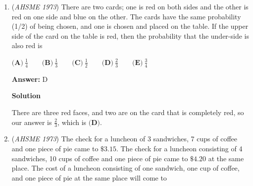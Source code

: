 \begin{enumerate}


 
 \textbf{Answer: }A



\textbf{Solution}

We can do casework upon the value of $x$. First, consider the case where both absolute values are positive, which is when $x \geq 1$. In this case, the equation becomes $2x + 1 < 5$. This turns into $x < 2$. Combining this with our original assumption, we get the solutions $1 \leq x < 2$. 

 Next, consider the case when both absolute values are negative, which is when $x < -2$. This yields $-1 - 2x < 5$, or $x > -3$. Combining this with our original assumption, we get $-3 < x < -2$

 The next case is when the first absolute value is positive and the second is negative. This occurs when $x \geq 1$ and $x < -2$. Obviously, this has no solutions, since the inequalities do not overlap.

 The final case is when the first absolute value is negative and the second is positive. This occurs when $x < 1$ and $x \geq -2$. This yields $3 < 5$, which is always true. Therefore, we also get the solutions $-2 \leq x < 1$.

 Therefore, after combining all of our solutions, we get the range $-3 < x < 2$, which is $\boxed{\textbf{A}}$.

 


	\item (\textit{AHSME 1973}) There are two cards; one is red on both sides and the other is red on one side and blue on the other. The cards have the same probability (1/2) of being chosen, and one is chosen and placed on the table. If the upper side of the card on the table is red, then the probability that the under-side is also red is 


 $\textbf{(A)}\ \frac14 \qquad \textbf{(B)}\ \frac13 \qquad \textbf{(C)}\ \frac12 \qquad \textbf{(D)}\ \frac23 \qquad \textbf{(E)}\ \frac34$

 \textbf{Answer: }D



\textbf{Solution}

There are three red faces, and two are on the card that is completely red, so our answer is $\frac{2}{3}$, which is $\boxed{\textbf{(D)}}$.

 


	\item (\textit{AHSME 1973}) The check for a luncheon of 3 sandwiches, 7 cups of coffee and one piece of pie came to $\$3.15$. The check for a luncheon consisting of 4 sandwiches, 10 cups of coffee and one piece of pie came to $\$4.20$ at the same place. The cost of a luncheon consisting of one sandwich, one cup of coffee, and one piece of pie at the same place will come to 



\end{enumerate}
